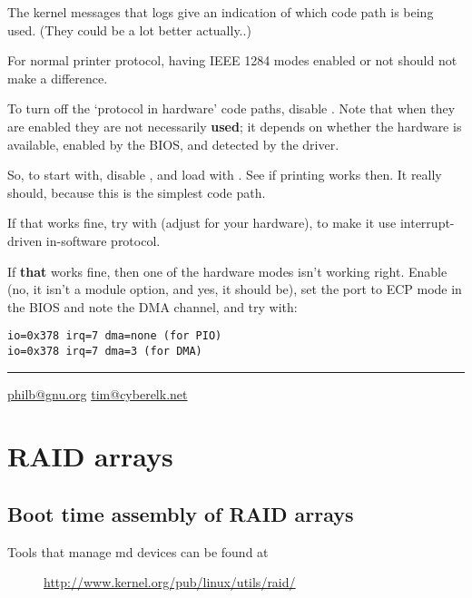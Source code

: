 \documentclass[a4paper,8pt,english]{sphinxmanual}
\begin{document}
The kernel messages that  logs give an indication of which
code path is being used. (They could be a lot better actually..)

For normal printer protocol, having IEEE 1284 modes enabled or not
should not make a difference.

To turn off the `protocol in hardware' code paths, disable
.  Note that when they are enabled they are not
necessarily \textbf{used}; it depends on whether the hardware is available,
enabled by the BIOS, and detected by the driver.

So, to start with, disable , and load 
with . See if printing works then.  It really should,
because this is the simplest code path.

If that works fine, try with  (adjust for your
hardware), to make it use interrupt-driven in-software protocol.

If \textbf{that} works fine, then one of the hardware modes isn't working
right.  Enable  (no, it isn't a module option,
and yes, it should be), set the port to ECP mode in the BIOS and note
the DMA channel, and try with:

\begin{Verbatim}[commandchars=\\\{\}]
io=0x378 irq=7 dma=none (for PIO)
io=0x378 irq=7 dma=3 (for DMA)
\end{Verbatim}


\bigskip\hrule{}\bigskip


\href{mailto:philb@gnu.org}{philb@gnu.org}
\href{mailto:tim@cyberelk.net}{tim@cyberelk.net}


\chapter{RAID arrays}
\label{admin-guide/md:raid-arrays}\label{admin-guide/md::doc}

\section{Boot time assembly of RAID arrays}
\label{admin-guide/md:boot-time-assembly-of-raid-arrays}\begin{description}
\item[{Tools that manage md devices can be found at}] \leavevmode
\href{http://www.kernel.org/pub/linux/utils/raid/}{http://www.kernel.org/pub/linux/utils/raid/}

\end{description}
\end{document}
